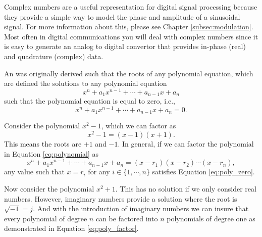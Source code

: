 \begin{aside}
Complex numbers are a useful representation for digital signal processing because they provide a simple way to model the phase and amplitude of a sinusoidal signal. For more information about this, please see Chapter \ref{subsec:modulation}. Most often in digital communications you will deal with complex numbers since it is easy to generate an analog to digital convertor that provides in-phase (real) and quadrature (complex) data. 

 An  was originally derived such that the roots of any polynomial equation, which are defined the solutions to any polynomial equation  
\begin{equation}
x^n + a_1 x^{n-1} + \cdots + a_{n-1} x + a_n
\label{eq:polynomial}
\end{equation}
such that the polynomial equation is equal to zero, i.e.,
\begin{equation}
x^n + a_1 x^{n-1} + \cdots + a_{n-1} x + a_n = 0.
\label{eq:poly_zero}
\end{equation}

Consider the polynomial $x^2 -1$, which we can factor as
\begin{equation}
x^2 - 1 = (x-1)(x+1).
\end{equation} This means the roots are $+1$ and $-1$. In general, if we can factor the polynomial in Equation \ref{eq:polynomial} as
\begin{equation}
x^n + a_1 x^{n-1} + \cdots + a_{n-1} x + a_n = (x - r_1)(x - r_2) \cdots (x - r_n),
\label{eq:poly_factor}
\end{equation} any value such that $x = r_i$ for any $i \in \{1, \cdots, n\}$ satisfies Equation \ref{eq:poly_zero}.

Now consider the polynomial $x^2 + 1$. This has no solution if we only consider real numbers. However, imaginary numbers provide a solution where the root is $\sqrt{-1} = j$. And with the introduction of imaginary numbers we can insure that every polynomial of degree $n$ can be factored into $n$ polynomials of degree one as demonstrated in Equation \ref{eq:poly_factor}.
\end{aside}

